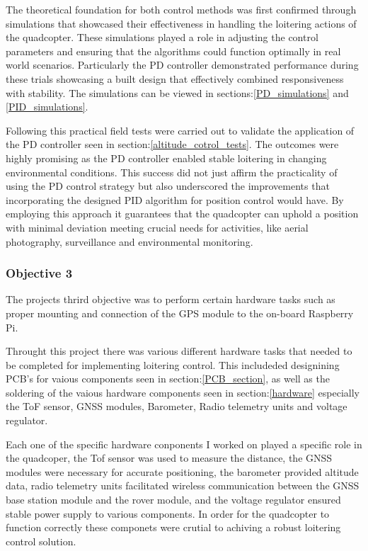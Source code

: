 \documentclass{report}
\begin{document}
The theoretical foundation for both control methods was first confirmed through
simulations that showcased their effectiveness in handling the loitering actions
of the quadcopter. These simulations played a role in adjusting the control
parameters and ensuring that the algorithms could function optimally in real
world scenarios. Particularly the PD controller demonstrated performance during
these trials showcasing a built design that effectively combined responsiveness
with stability. The simulations can be viewed in sections:\ref{PD_simulations}
and \ref{PID_simulations}.

Following this practical field tests were carried out to validate the
application of the PD controller seen in section:\ref{altitude_cotrol_tests}.
The outcomes were highly promising as the PD controller enabled stable loitering
in changing environmental conditions. This success did not just affirm the
practicality of using the PD control strategy but also underscored the
improvements that incorporating the designed PID algorithm for position control
would have. By employing this approach it guarantees that the quadcopter can
uphold a position with minimal deviation meeting crucial needs for activities,
like aerial photography, surveillance and environmental monitoring.

\subsubsection*{Objective 3}
The projects thrird objective was to perform certain hardware tasks such as
proper mounting and connection of the GPS module to the on-board Raspberry Pi.

Throught this project there was various different hardware tasks that needed to
be completed for implementing loitering control. This includeded designining
PCB's for vaious components seen in section:\ref{PCB_section}, as well as the
soldering of the vaious hardware components seen in section:\ref{hardware}
especially the ToF sensor, GNSS modules, Barometer, Radio telemetry units and
voltage regulator. 

Each one of the specific hardware conponents I worked on played a specific role
in the quadcoper, the Tof sensor was used to measure the distance, the GNSS
modules were necessary for accurate positioning, the barometer provided altitude
data, radio telemetry units facilitated wireless communication between the GNSS
base station module and the rover module, and the voltage regulator ensured
stable power supply to various components. In order for the quadcopter to
function correctly these componets were crutial to achiving a robust loitering
control solution.
\end{document}
